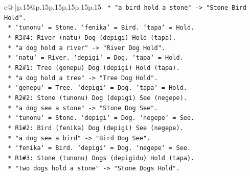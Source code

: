 \documentclass{article}
\begin{document}
{\begin{supertabular}{c@{$\;$}|p{.15\linewidth}@{}p{.15\linewidth}p{.15\linewidth}p{.15\linewidth}p{.15\linewidth}p{.15\linewidth}}
{{{\texttt{                                                                *   "a bird hold a stone" {-}> "Stone Bird Hold".} \\
\texttt{                                                                *   `tunonu` = Stone. `fenika` = Bird. `tapa` = Hold.} \\
\texttt{                                                            *   R3\#4: River (natu) Dog (depigi) Hold (tapa).} \\
\texttt{                                                                *   "a dog hold a river" {-}> "River Dog Hold".} \\
\texttt{                                                                *   `natu` = River. `depigi` = Dog. `tapa` = Hold.} \\
\texttt{                                                            *   R2\#1: Tree (genepu) Dog (depigi) Hold (tapa).} \\
\texttt{                                                                *   "a dog hold a tree" {-}> "Tree Dog Hold".} \\
\texttt{                                                                *   `genepu` = Tree. `depigi` = Dog. `tapa` = Hold.} \\
\texttt{                                                            *   R2\#2: Stone (tunonu) Dog (depigi) See (negepe).} \\
\texttt{                                                                *   "a dog see a stone" {-}> "Stone Dog See".} \\
\texttt{                                                                *   `tunonu` = Stone. `depigi` = Dog. `negepe` = See.} \\
\texttt{                                                            *   R1\#2: Bird (fenika) Dog (depigi) See (negepe).} \\
\texttt{                                                                *   "a dog see a bird" {-}> "Bird Dog See".} \\
\texttt{                                                                *   `fenika` = Bird. `depigi` = Dog. `negepe` = See.} \\
\texttt{                                                            *   R1\#3: Stone (tunonu) Dogs (depigidu) Hold (tapa).} \\
\texttt{                                                                *   "two dogs hold a stone" {-}> "Stone Dogs Hold".} \\
}}}
\end{supertabular}}
\end{document}
